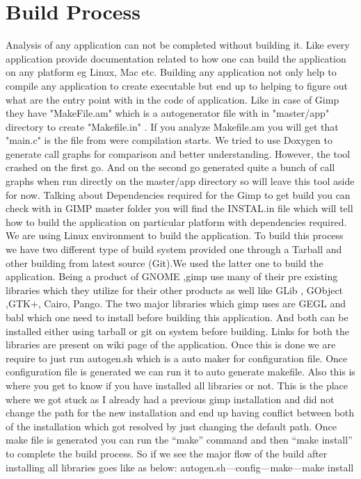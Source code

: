 \section{Build Process}
Analysis of any application can not be completed without building it. Like every application provide documentation related to how one can build the application on any platform eg Linux, Mac etc.
Building any application not only help to compile any application to create executable but end up to helping to figure out what are the entry point with in the code of application.  Like in case of Gimp they have "MakeFile.am" which is a autogenerator file with in "master/app" directory to create "Makefile.in" . If you analyze Makefile.am you will get that "main.c" is the file from were compilation starts.
\newline
We tried to use Doxygen to generate call graphs for comparison and better understanding. However, the tool crashed on the first go. And on the second go generated quite a bunch of call graphs when run directly on the master/app directory so will leave this tool aside for now. 
\newline 
Talking about Dependencies required for the Gimp to get build you can check with in GIMP master folder you will find the INSTAL.in file which will tell how to build the application on particular platform with dependencies required. We are using Linux environment to build the application.
To build this process we have two different type of	build system provided one through a Tarball and other  building from latest source (Git).We used the latter one to build the application.
Being a product of GNOME ,gimp use many of their pre existing libraries which they utilize for their other products  as well like GLib , GObject ,GTK+, Cairo, Pango. 
The two major libraries which gimp uses are GEGL and babl which one need to install before building this application. And both can be installed either using tarball or git on system before building. Links for both the libraries are present on wiki page of the application.\cite{wiki}
\newline 
Once this is done we are require to just run autogen.sh which is a auto maker for configuration file. Once configuration file is generated we can run it to auto generate makefile. Also this is where you get to know if you have installed all libraries or not. This is the place where we got stuck as I already had a previous gimp installation and did not change the path for the new installation and end up having conflict between both of the installation which got resolved by just changing the default path. Once make file is generated you can run the “make” command  and then “make install”  to complete the build process.
So if we see the major flow of the build after installing all libraries goes like  
as below:
\newline
 autogen.sh---config---make---make install
\newline






